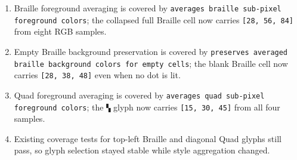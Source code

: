 \begin{enumerate}
\def\labelenumi{\arabic{enumi}.}
\tightlist
\item
  Braille foreground averaging is covered by \texttt{a\allowbreak{}v\allowbreak{}e\allowbreak{}r\allowbreak{}a\allowbreak{}g\allowbreak{}e\allowbreak{}s\allowbreak{} \allowbreak{}b\allowbreak{}r\allowbreak{}a\allowbreak{}i\allowbreak{}l\allowbreak{}l\allowbreak{}e\allowbreak{} \allowbreak{}s\allowbreak{}u\allowbreak{}b\allowbreak{}-\allowbreak{}p\allowbreak{}i\allowbreak{}x\allowbreak{}e\allowbreak{}l\allowbreak{} \allowbreak{}f\allowbreak{}o\allowbreak{}r\allowbreak{}e\allowbreak{}g\allowbreak{}r\allowbreak{}o\allowbreak{}u\allowbreak{}n\allowbreak{}d\allowbreak{} \allowbreak{}c\allowbreak{}o\allowbreak{}l\allowbreak{}o\allowbreak{}r\allowbreak{}s}; the collapsed full Braille cell now carries \texttt{[\allowbreak{}2\allowbreak{}8\allowbreak{},\allowbreak{} \allowbreak{}5\allowbreak{}6\allowbreak{},\allowbreak{} \allowbreak{}8\allowbreak{}4\allowbreak{}]} from eight RGB samples.
\item
  Empty Braille background preservation is covered by \texttt{p\allowbreak{}r\allowbreak{}e\allowbreak{}s\allowbreak{}e\allowbreak{}r\allowbreak{}v\allowbreak{}e\allowbreak{}s\allowbreak{} \allowbreak{}a\allowbreak{}v\allowbreak{}e\allowbreak{}r\allowbreak{}a\allowbreak{}g\allowbreak{}e\allowbreak{}d\allowbreak{} \allowbreak{}b\allowbreak{}r\allowbreak{}a\allowbreak{}i\allowbreak{}l\allowbreak{}l\allowbreak{}e\allowbreak{} \allowbreak{}b\allowbreak{}a\allowbreak{}c\allowbreak{}k\allowbreak{}g\allowbreak{}r\allowbreak{}o\allowbreak{}u\allowbreak{}n\allowbreak{}d\allowbreak{} \allowbreak{}c\allowbreak{}o\allowbreak{}l\allowbreak{}o\allowbreak{}r\allowbreak{}s\allowbreak{} \allowbreak{}f\allowbreak{}o\allowbreak{}r\allowbreak{} \allowbreak{}e\allowbreak{}m\allowbreak{}p\allowbreak{}t\allowbreak{}y\allowbreak{} \allowbreak{}c\allowbreak{}e\allowbreak{}l\allowbreak{}l\allowbreak{}s}; the blank Braille cell now carries \texttt{[\allowbreak{}2\allowbreak{}8\allowbreak{},\allowbreak{} \allowbreak{}3\allowbreak{}8\allowbreak{},\allowbreak{} \allowbreak{}4\allowbreak{}8\allowbreak{}]} even when no dot is lit.
\item
  Quad foreground averaging is covered by \texttt{a\allowbreak{}v\allowbreak{}e\allowbreak{}r\allowbreak{}a\allowbreak{}g\allowbreak{}e\allowbreak{}s\allowbreak{} \allowbreak{}q\allowbreak{}u\allowbreak{}a\allowbreak{}d\allowbreak{} \allowbreak{}s\allowbreak{}u\allowbreak{}b\allowbreak{}-\allowbreak{}p\allowbreak{}i\allowbreak{}x\allowbreak{}e\allowbreak{}l\allowbreak{} \allowbreak{}f\allowbreak{}o\allowbreak{}r\allowbreak{}e\allowbreak{}g\allowbreak{}r\allowbreak{}o\allowbreak{}u\allowbreak{}n\allowbreak{}d\allowbreak{} \allowbreak{}c\allowbreak{}o\allowbreak{}l\allowbreak{}o\allowbreak{}r\allowbreak{}s}; the \texttt{▚} glyph now carries \texttt{[\allowbreak{}1\allowbreak{}5\allowbreak{},\allowbreak{} \allowbreak{}3\allowbreak{}0\allowbreak{},\allowbreak{} \allowbreak{}4\allowbreak{}5\allowbreak{}]} from all four samples.
\item
  Existing coverage tests for top-left Braille and diagonal Quad glyphs still pass, so glyph selection stayed stable while style aggregation changed.
\end{enumerate}

